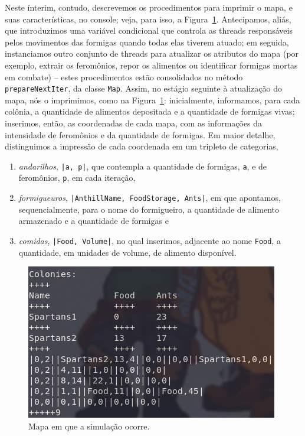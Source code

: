 \documentclass[12pt]{article}
\theoremstyle{definition}
\begin{document}
Neste ínterim, contudo, descrevemos os procedimentos para imprimir o mapa, e suas características, no console; veja, para isso, a Figura~\ref{fig:map}. Antecipamos, aliás, que introduzimos uma variável condicional que controla as threads responsáveis pelos movimentos das formigas quando todas elas tiverem atuado; em seguida, instanciamos outro conjunto de threads para atualizar os atributos do mapa (por exemplo, extrair os feromônios, repor os alimentos ou identificar formigas mortas em combate) -- estes procedimentos estão consolidados no método \texttt{prepareNextIter}, da classe \texttt{Map}. Assim, no estágio seguinte à atualização do mapa, nós o imprimimos, como na Figura~\ref{fig:map}: inicialmente, informamos, para cada colônia, a quantidade de alimentos depositada e a quantidade de formigas vivas; inserimos, então, as coordenadas de cada mapa, com as informações da intensidade de feromônios e da quantidade de formigas. Em maior detalhe, distinguimos a impressão de cada coordenada em um tripleto de categorias, 

\begin{enumerate} 
	\item \textit{andarilhos}, \texttt{|a, p|}, que contempla a quantidade de formigas, \texttt{a}, e de feromônios, \texttt{p}, em cada iteração, 
	\item \textit{formigueuros}, \texttt{|AnthillName, FoodStorage, Ants|}, em que apontamos, sequencialmente, para o nome do formigueiro, a quantidade de alimento armazenado e a quantidade de formigas e 
	\item \textit{comidas}, \texttt{|Food, Volume|}, no qual inserimos, adjacente ao nome \texttt{Food}, a quantidade, em unidades de volume, de alimento disponível. 
\end{enumerate} 


\begin{figure} 
	\centering 
	\includegraphics[width = \textwidth]{map.png} 
	\caption{Mapa em que a simulação ocorre.} 
	\label{fig:map} 
\end{figure} 
\end{document}
